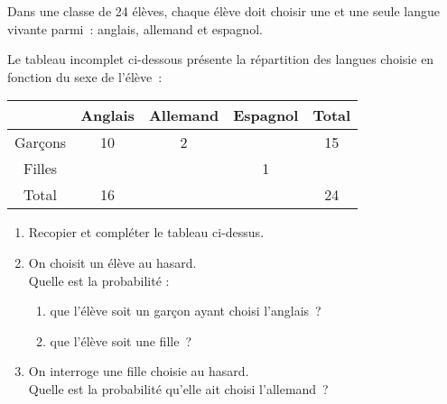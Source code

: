 
%
Dans une classe de 24 élèves, chaque élève doit choisir une et une seule langue vivante parmi~: anglais, allemand et espagnol.
\par
Le tableau incomplet ci-dessous présente la répartition des langues choisie en fonction du sexe de l'élève~:
\begin{center}
     \begin{tabular}{|c|c|c|c|c|} %
          \hline
          & Anglais & Allemand & Espagnol & Total \\
          \hline
          Garçons & 10 & 2 &   & 15 \\
          \hline
          Filles &   &   & 1 &   \\
          \hline
          Total & 16  &   &  &  24 \\
          \hline
     \end{tabular}
\end{center}
\begin{enumerate}
     \item %
     Recopier et compléter le tableau ci-dessus.
     \item %
     On choisit un élève au hasard.\\
     Quelle est la probabilité :
     \begin{enumerate}[label=\alph*.]
          \item %
          que l'élève soit un garçon ayant choisi l'anglais~?
          \item %
          que l'élève soit une fille~?
     \end{enumerate}
     \item %
     On interroge une fille choisie au hasard. \\
     Quelle est la probabilité qu'elle ait choisi l'allemand~?
\end{enumerate}
